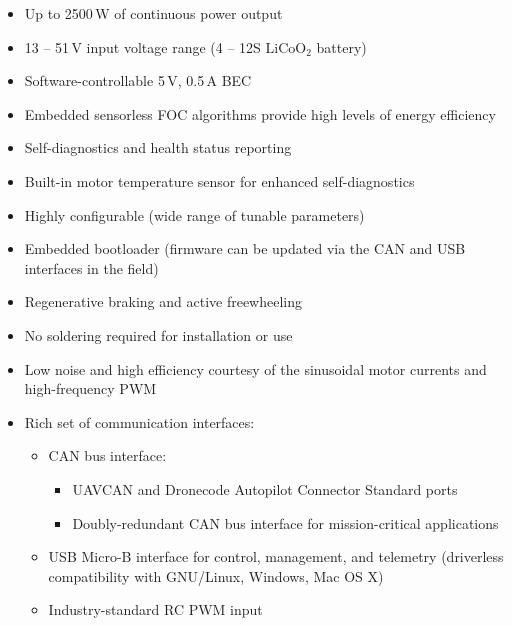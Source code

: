 \documentclass{zubaxdoc}
\begin{document}
\begin{titlepage}
\begin{itemize}[leftmargin=!,labelindent=!,itemindent=0pt]
    \item Up to 2500\,W of continuous power output
    \item 13 -- 51\,V input voltage range (4 -- 12S $\text{LiCoO}_\text{2}$ battery)
    \item Software-controllable 5\,V, 0.5\,A BEC
    \item Embedded sensorless FOC algorithms provide high levels of energy efficiency
    \item Self-diagnostics and health status reporting
    \item Built-in motor temperature sensor for enhanced self-diagnostics
    \item Highly configurable (wide range of tunable parameters)
    \item Embedded bootloader (firmware can be updated via the CAN and USB interfaces in the field)
    \item Regenerative braking and active freewheeling
    \item No soldering required for installation or use
    \item Low noise and high efficiency courtesy of the sinusoidal motor currents and high-frequency PWM
    \item Rich set of communication interfaces:
     \begin{itemize}[itemindent=0pt]
        \item CAN bus interface:
        \begin{itemize}[leftmargin=8pt,itemindent=0pt]
            \item UAVCAN and Dronecode Autopilot Connector Standard ports
            \item Doubly-redundant CAN bus interface for mission-critical applications
        \end{itemize}
        \item USB Micro-B interface for control, management, and telemetry (driverless compatibility
              with GNU/Linux, Windows, Mac OS X)
        \item Industry-standard RC PWM input
    \end{itemize}
\end{itemize}


\end{titlepage}
\end{document}
